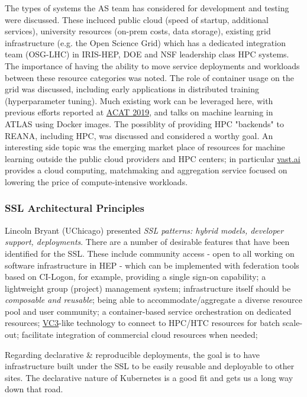 \documentclass[11pt,letterpaper,fleqn]{article}
\begin{document}
The types of systems the AS team has considered for development and testing were discussed.  These incluced public cloud (speed of startup, additional services), university resources (on-prem costs, data storage), existing grid infrastructure (e.g. the Open Science Grid) which has a dedicated integration team (OSG-LHC) in IRIS-HEP, DOE and NSF leadership class HPC systems.  The importance of having the ability to move service deployments and workloads between these resource categories was noted.
The role of container usage on the grid was discussed, including early applications in distributed training (hyperparameter tuning).  Much existing work can be leveraged here, with previous efforts reported at \href{https://indico.cern.ch/event/708041/}{ACAT 2019}, and talks on machine learning in ATLAS using Docker images.
The possiblity of providing HPC "backends" to REANA, including HPC, was discussed and considered a worthy goal.  An interesting side topic was the emerging market place of resources for machine learning outside the public cloud providers and HPC centers; in particular \href{Vast.ai}{vast.ai} provides a cloud computing,   matchmaking and aggregation service focused on lowering the price of compute-intensive workloads.

\subsubsection{SSL Architectural Principles}
\vspace{0.2cm}
Lincoln Bryant (UChicago) presented {\it SSL patterns: hybrid models, developer support, deployments}.  There are a number of desirable features that have been identified for the SSL.  These include community access - open to all working on software infrastructure in HEP - which can be implemented with federation tools based on CI-Logon, for example, providing a single sign-on capability; a lightweight group (project) management system; infrastructure itself should be {\it composable and reusable}; being able to accommodate/aggregate a diverse resource pool and user community; a container-based service orchestration on dedicated resources; \href{http://www.virtualclusters.org/}{VC3}-like technology to connect to HPC/HTC resources for batch scale-out; facilitate integration of commercial cloud resources when needed;

Regarding declarative \& reproducible deployments, the goal is to have infrastructure built under the SSL to be easily reusable and deployable to other sites. The
declarative nature of Kubernetes is a good fit and gets us a long way down that road.
\end{document}
